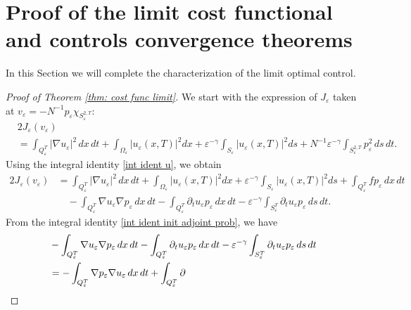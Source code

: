 \documentclass[reqno]{amsart}
\begin{document}
\section{Proof of the limit cost functional and controls convergence theorems}

In this Section we will complete the characterization of the limit optimal
control.

\begin{proof}[Proof of Theorem \ref{thm: cost func limit}]
 We start with the expression of $J_{\varepsilon }$ taken at 
 $v_{\varepsilon }=-N^{-1}p_{\varepsilon }\chi_{S_{\varepsilon }^{2,T}}$:
\begin{align*}
&2J_{\varepsilon }(v_{\varepsilon })\\
&=\int _{Q_{\varepsilon}^{T}}|\nabla u_{\varepsilon }|^2\,dx\,dt
 +\int _{\Omega _{\varepsilon}}|u_{\varepsilon }(x,T)|^2{dx} 
 +\varepsilon ^{-\gamma }\int _{S_{\varepsilon }}|u_{\varepsilon
 }(x,T)|^2{ds}+N^{-1}\varepsilon ^{-\gamma }\int _{S_{\varepsilon
 }^{2,T}}p_{\varepsilon }^2\,ds\,dt.
\end{align*}
Using the integral identity \eqref{int ident u}, we obtain
\begin{equation}
\begin{aligned}
2J_{\varepsilon }(v_{\varepsilon })
&=\int _{Q_{\varepsilon
}^{T}}|\nabla u_{\varepsilon }|^2\,dx\,dt
 +\int _{\Omega _{\varepsilon}}|u_{\varepsilon }(x,T)|^2{dx}
 +\varepsilon ^{-\gamma }\int_{S_{\varepsilon }}|u_{\varepsilon }(x,T)|^2{ds}
 +\int_{Q_{\varepsilon }^{T}}fp_{\varepsilon }\,dx\,dt    \\
&\quad -\int _{Q_{\varepsilon }^{T}}\nabla u_{\varepsilon }\nabla
 p_{\varepsilon }\,dx\,dt
 -\int _{Q_{\varepsilon }^{T}}\partial
 _{t}u_{\varepsilon }p_{\varepsilon }\,dx\,dt
 -\varepsilon ^{-\gamma }\int
_{S_{\varepsilon }^{T}}\partial _{t}u_{\varepsilon }
p_{\varepsilon }\,ds\,dt.
\end{aligned}  \label{thm: cost func step 1}
\end{equation}
From the integral identity \eqref{int ident init adjoint prob}, we have
\begin{align*}
&-\int _{Q_{\varepsilon }^{T}}\nabla u_{\varepsilon }\nabla
p_{\varepsilon }\,dx\,dt-\int _{Q_{\varepsilon }^{T}}\partial
_{t}u_{\varepsilon }p_{\varepsilon }\,dx\,dt-\varepsilon ^{-\gamma }\int
_{S_{\varepsilon }^{T}}\partial _{t}u_{\varepsilon }p_{\varepsilon }{%
\,ds\,dt} \\
&=-\int _{Q_{\varepsilon }^{T}}\nabla p_{\varepsilon }\nabla
u_{\varepsilon }\,dx\,dt+\int _{Q_{\varepsilon }^{T}}\partial

\end{align*}
\end{proof}
\end{document}
